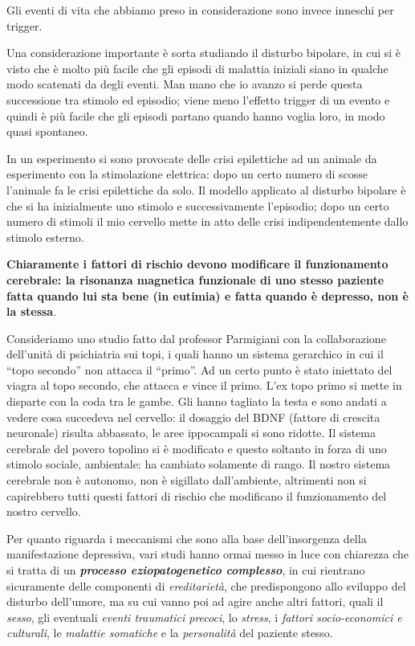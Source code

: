 \documentclass[]{article}
\begin{document}
Gli eventi di vita che abbiamo preso in considerazione sono invece
inneschi per trigger.

Una considerazione importante è sorta studiando il disturbo bipolare, in
cui si è visto che è molto più facile che gli episodi di malattia
iniziali siano in qualche modo scatenati da degli eventi. Man mano che
io avanzo si perde questa successione tra stimolo ed episodio; viene
meno l'effetto trigger di un evento e quindi è più facile che gli
episodi partano quando hanno voglia loro, in modo quasi spontaneo.

In un esperimento si sono provocate delle crisi epilettiche ad un
animale da esperimento con la stimolazione elettrica: dopo un certo
numero di scosse l'animale fa le crisi epilettiche da solo. Il modello
applicato al disturbo bipolare è che si ha inizialmente uno stimolo e
successivamente l'episodio; dopo un certo numero di stimoli il mio
cervello mette in atto delle crisi indipendentemente dallo stimolo
esterno.

\textbf{Chiaramente i fattori di rischio devono modificare il
funzionamento cerebrale: la risonanza magnetica funzionale di uno stesso
paziente fatta quando lui sta bene (in eutimia) e fatta quando è
depresso, non è la stessa}.

Consideriamo uno studio fatto dal professor Parmigiani con la
collaborazione dell'unità di psichiatria sui topi, i quali hanno un
sistema gerarchico in cui il ``topo secondo'' non attacca il ``primo''.
Ad un certo punto è stato iniettato del viagra al topo secondo, che
attacca e vince il primo. L'ex topo primo si mette in disparte con la
coda tra le gambe. Gli hanno tagliato la testa e sono andati a vedere
cosa succedeva nel cervello: il dosaggio del BDNF (fattore di crescita
neuronale) risulta abbassato, le aree ippocampali si sono ridotte. Il
sistema cerebrale del povero topolino si è modificato e questo soltanto
in forza di uno stimolo sociale, ambientale: ha cambiato solamente di
rango. Il nostro sistema cerebrale non è autonomo, non è sigillato
dall'ambiente, altrimenti non si capirebbero tutti questi fattori di
rischio che modificano il funzionamento del nostro cervello.

Per quanto riguarda i meccanismi che sono alla base dell'insorgenza
della manifestazione depressiva, vari studi hanno ormai messo in luce
con chiarezza che si tratta di un \textbf{\emph{processo
eziopatogenetico complesso}}, in cui rientrano sicuramente delle
componenti di \emph{ereditarietà}, che predispongono allo sviluppo del
disturbo dell'umore, ma su cui vanno poi ad agire anche altri fattori,
quali il \emph{sesso}, gli eventuali \emph{eventi traumatici precoci},
lo \emph{stress}, i \emph{fattori socio-economici e culturali}, le
\emph{malattie somatiche} e la \emph{personalità} del paziente stesso.
\end{document}
